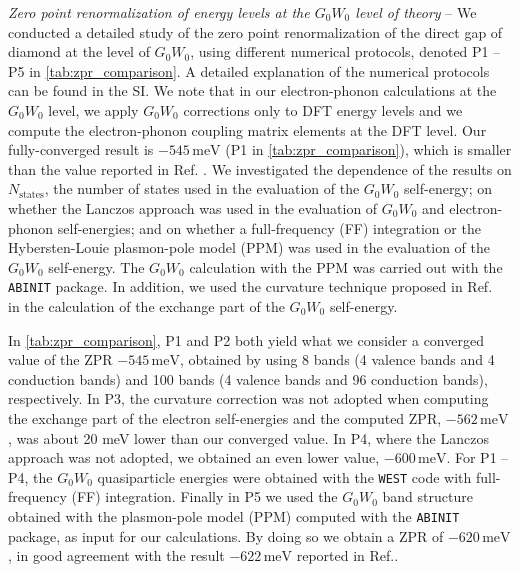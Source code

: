 \documentclass[journal=jctcce,manuscript=article]{achemso}
\begin{document}
{\it Zero point renormalization of energy levels at the $G_0W_0$ level of theory} -- We conducted a detailed study of the zero point renormalization of the direct gap of diamond at the level of $G_0W_0$, using different numerical  protocols, denoted P1 -- P5 in \autoref{tab:zpr_comparison}. A detailed explanation of the numerical protocols can be found in the SI. We note that in our electron-phonon calculations at the $G_0W_0$ level, we apply  $G_0W_0$ corrections only to DFT energy levels and we compute the electron-phonon coupling matrix elements at the DFT level. Our  fully-converged result is $-545\,\mathrm{meV}$ (P1 in \autoref{tab:zpr_comparison}), which is smaller than the value reported in Ref. .  We investigated the dependence of the results on $N_\mathrm{states}$, the number of states used in the evaluation of the $G_0W_0$ self-energy; on whether the Lanczos approach was used in the evaluation of $G_0W_0$ and electron-phonon self-energies; and on whether a full-frequency (FF) integration or the Hybersten-Louie plasmon-pole model (PPM) was used in the evaluation of the $G_0W_0$ self-energy. The $G_0W_0$ calculation with the PPM was carried out with the \texttt{ABINIT} package.\cite{gonze2020abinit,bruneval2006effect} In addition, we used the curvature technique proposed in Ref.~ in the calculation of the  exchange part of the $G_0W_0$ self-energy.

In \autoref{tab:zpr_comparison}, P1 and P2 both yield what we consider a converged value of the ZPR $-545\,\mathrm{meV}$, obtained by using  8 bands (4 valence bands and 4 conduction bands) and 100 bands (4 valence bands and 96 conduction bands), respectively.  In P3, the curvature correction was not adopted when computing the exchange part of the electron self-energies and the computed ZPR, $-562\,\mathrm{meV}$, was about 20 meV lower than our converged value. In P4, where the Lanczos approach was not adopted, we obtained an even lower value,  $-600\,\mathrm{meV}$. For P1 -- P4, the $G_0W_0$ quasiparticle energies were obtained with the \texttt{WEST} code\cite{govoni2015large} with full-frequency (FF) integration. Finally in P5 we used the $G_0W_0$ band structure obtained with the plasmon-pole model (PPM) computed with the \texttt{ABINIT} package, as input for our calculations. By doing so we obtain a ZPR of $-620\,\mathrm{meV}$, in good agreement with the result $-622\,\mathrm{meV}$ reported in  Ref..
\end{document}
